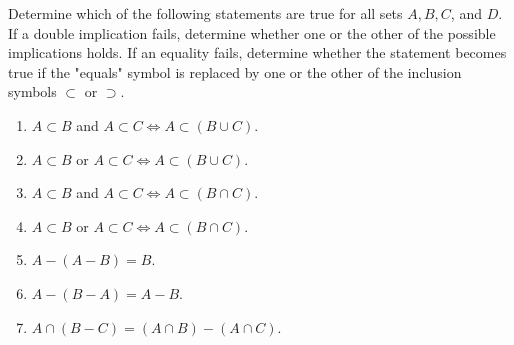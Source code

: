 \documentclass[../../master.tex]{subfiles}
\begin{document}
\begin{exercise}
    Determine which of the following statements are true for all sets $A, B, C$, and $D$.
    If a double implication fails, determine whether one or the other of the possible implications holds.
    If an equality fails, determine whether the statement becomes true if the "equals" symbol is replaced by one or the other of the inclusion symbols $\subset$ or $\supset$.
    \begin{enumerate}[label=(\alph*)]
        \item $A \subset B$ and $A \subset C \Leftrightarrow A \subset (B \cup C)$.
        \item $A \subset B$ or $A \subset C \Leftrightarrow A \subset (B \cup C)$.
        \item $A \subset B$ and $A \subset C \Leftrightarrow A \subset (B \cap C)$.
        \item $A \subset B$ or $A \subset C \Leftrightarrow A \subset (B \cap C)$.
        \item $A - (A - B) = B$.
        \item $A - (B - A) = A - B$.
        \item $A \cap (B - C) = (A \cap B) - (A \cap C)$.
    \end{enumerate}
\end{exercise}
\end{document}
